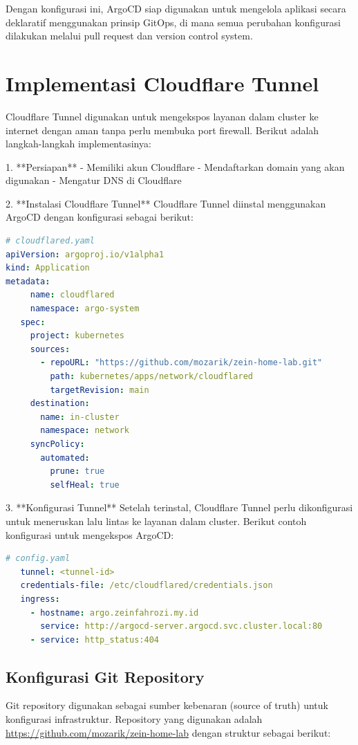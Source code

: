 Dengan konfigurasi ini, ArgoCD siap digunakan untuk mengelola aplikasi secara deklaratif menggunakan prinsip GitOps, di mana semua perubahan konfigurasi dilakukan melalui pull request dan version control system.

\section{Implementasi Cloudflare Tunnel}
Cloudflare Tunnel digunakan untuk mengekspos layanan dalam cluster ke internet dengan aman tanpa perlu membuka port firewall. Berikut adalah langkah-langkah implementasinya:

1. **Persiapan**
- Memiliki akun Cloudflare
- Mendaftarkan domain yang akan digunakan
- Mengatur DNS di Cloudflare

2. **Instalasi Cloudflare Tunnel**
Cloudflare Tunnel diinstal menggunakan ArgoCD dengan konfigurasi sebagai berikut:

\begin{lstlisting}[language=yaml, basicstyle=\footnotesize\ttfamily]
# cloudflared.yaml
apiVersion: argoproj.io/v1alpha1
kind: Application
metadata:
     name: cloudflared
     namespace: argo-system
   spec:
     project: kubernetes
     sources:
       - repoURL: "https://github.com/mozarik/zein-home-lab.git"
         path: kubernetes/apps/network/cloudflared
         targetRevision: main
     destination:
       name: in-cluster
       namespace: network
     syncPolicy:
       automated:
         prune: true
         selfHeal: true
\end{lstlisting}

3. **Konfigurasi Tunnel**
Setelah terinstal, Cloudflare Tunnel perlu dikonfigurasi untuk meneruskan lalu lintas ke layanan dalam cluster. Berikut contoh konfigurasi untuk mengekspos ArgoCD:

\begin{lstlisting}[language=yaml, basicstyle=\footnotesize\ttfamily]
   # config.yaml
   tunnel: <tunnel-id>
   credentials-file: /etc/cloudflared/credentials.json
   ingress:
     - hostname: argo.zeinfahrozi.my.id
       service: http://argocd-server.argocd.svc.cluster.local:80
     - service: http_status:404
   \end{lstlisting}

\subsection{Konfigurasi Git Repository}
Git repository digunakan sebagai sumber kebenaran (source of truth) untuk konfigurasi infrastruktur. Repository yang digunakan adalah \url{https://github.com/mozarik/zein-home-lab} dengan struktur sebagai berikut:



